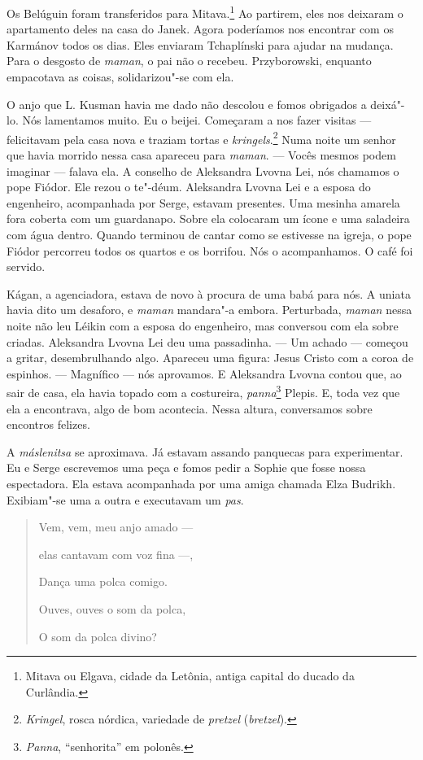 Os Belúguin foram transferidos para Mitava.\footnote{Mitava ou Elgava,
  cidade da Letônia, antiga capital do ducado da Curlândia.} Ao
partirem, eles nos deixaram o apartamento deles na casa do Janek. Agora
poderíamos nos encontrar com os Karmánov todos os dias. Eles enviaram
Tchaplínski para ajudar na mudança. Para o desgosto de \emph{maman}, o
pai não o recebeu. Przyborowski, enquanto empacotava as coisas,
solidarizou"-se com ela.

O anjo que L. Kusman havia me dado não descolou e fomos obrigados a
deixá"-lo. Nós lamentamos muito. Eu o beijei. Começaram a nos fazer
visitas --- felicitavam pela casa nova e traziam tortas e
\emph{kringels}.\footnote{\emph{Kringel}, rosca nórdica, variedade de
  \emph{pretzel} (\emph{bretzel}).} Numa noite um senhor que
havia morrido nessa casa apareceu para \emph{maman}. --- Vocês mesmos
podem imaginar --- falava ela. A conselho de Aleksandra Lvovna Lei, nós
chamamos o pope Fiódor. Ele rezou o te"-déum. Aleksandra Lvovna Lei e a
esposa do engenheiro, acompanhada por Serge, estavam presentes. Uma
mesinha amarela fora coberta com um guardanapo. Sobre ela colocaram um
ícone e uma saladeira com água dentro. Quando terminou de cantar como se
estivesse na igreja, o pope Fiódor percorreu todos os quartos e os
borrifou. Nós o acompanhamos. O café foi servido.

Kágan, a agenciadora, estava de novo à procura de uma babá para nós. A
uniata havia dito um desaforo, e \emph{maman} mandara"-a embora.
Perturbada, \emph{maman} nessa noite não leu Léikin com a esposa do
engenheiro, mas conversou com ela sobre criadas. Aleksandra Lvovna Lei
deu uma passadinha. --- Um achado --- começou a gritar, desembrulhando
algo. Apareceu uma figura: Jesus Cristo com a coroa de espinhos. ---
Magnífico --- nós aprovamos. E Aleksandra Lvovna contou que, ao sair de
casa, ela havia topado com a costureira, \emph{panna}\footnote{\emph{Panna},
  ``senhorita'' em polonês.} Plepis. E, toda vez que ela a encontrava,
algo de bom acontecia. Nessa altura, conversamos sobre encontros
felizes.

A \emph{máslenitsa} se aproximava. Já estavam assando panquecas para
experimentar. Eu e Serge escrevemos uma peça e fomos pedir a Sophie que
fosse nossa espectadora. Ela estava acompanhada por uma amiga chamada
Elza Budrikh. Exibiam"-se uma a outra e executavam um \emph{pas}.

\begin{quotation}
Vem, vem, meu anjo amado ---

elas cantavam com voz fina ---,

Dança uma polca comigo.

Ouves, ouves o som da polca,

O som da polca divino?
\end{quotation}

